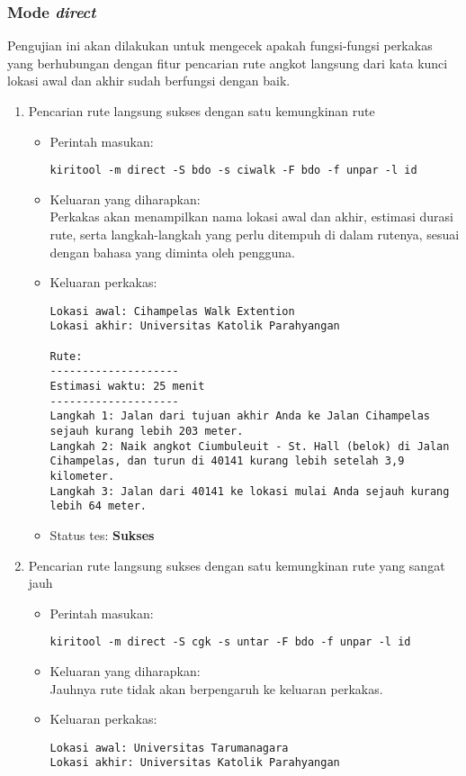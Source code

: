\subsubsection{Mode \textit{direct}}
\label{sec:testing-experiments-testing-directroute}

Pengujian ini akan dilakukan untuk mengecek apakah fungsi-fungsi perkakas yang berhubungan dengan fitur pencarian rute angkot langsung dari kata kunci lokasi awal dan akhir sudah berfungsi dengan baik.

\begin{enumerate}
	\item Pencarian rute langsung sukses dengan satu kemungkinan rute
	\begin{itemize}
		\item Perintah masukan:
		\begin{verbatim}
kiritool -m direct -S bdo -s ciwalk -F bdo -f unpar -l id
		\end{verbatim}
		\item Keluaran yang diharapkan: \\
		Perkakas akan menampilkan nama lokasi awal dan akhir, estimasi durasi rute, serta langkah-langkah yang perlu ditempuh di dalam rutenya, sesuai dengan bahasa yang diminta oleh pengguna.
		\item Keluaran perkakas:
		\begin{lstlisting}
Lokasi awal: Cihampelas Walk Extention
Lokasi akhir: Universitas Katolik Parahyangan

Rute:
--------------------
Estimasi waktu: 25 menit 
--------------------
Langkah 1: Jalan dari tujuan akhir Anda ke Jalan Cihampelas sejauh kurang lebih 203 meter.
Langkah 2: Naik angkot Ciumbuleuit - St. Hall (belok) di Jalan Cihampelas, dan turun di 40141 kurang lebih setelah 3,9 kilometer.
Langkah 3: Jalan dari 40141 ke lokasi mulai Anda sejauh kurang lebih 64 meter.
		\end{lstlisting}
		\item Status tes: \textbf{Sukses}
	\end{itemize}
	
	\item Pencarian rute langsung sukses dengan satu kemungkinan rute yang sangat jauh
	\begin{itemize}
		\item Perintah masukan:
		\begin{verbatim}
kiritool -m direct -S cgk -s untar -F bdo -f unpar -l id
		\end{verbatim}
		\item Keluaran yang diharapkan: \\
		Jauhnya rute tidak akan berpengaruh ke keluaran perkakas.
		\item Keluaran perkakas:
		\begin{lstlisting}
Lokasi awal: Universitas Tarumanagara
Lokasi akhir: Universitas Katolik Parahyangan


\end{lstlisting}
\end{itemize}
\end{enumerate}
